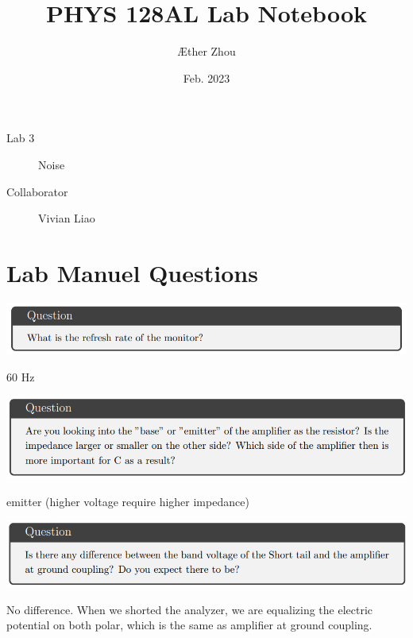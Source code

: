 \documentclass[a4paper]{tufte-handout}
\title{PHYS 128AL Lab Notebook}
\author[]{\AE ther Zhou}
\date{Feb. 2023}
\begin{document}
\maketitle

\begin{projects}
	\begin{description}
        \item [Lab 3] Noise 
		\item [Collaborator] Vivian Liao
		\end{description}
\end{projects}

\tableofcontents

\newpage

\section{Lab Manuel Questions}

\includegraphics[width = 1\textwidth]{figures/q1.png}

60 Hz 

\hrulefill

\includegraphics[width = 1\textwidth]{figures/q2.png}

emitter (higher voltage require higher impedance)

\hrulefill

\includegraphics[width = 1\textwidth]{figures/q3.png}

No difference. When we shorted the analyzer, we are equalizing the electric potential on both polar, which is the same as amplifier at ground coupling.
\end{document}
